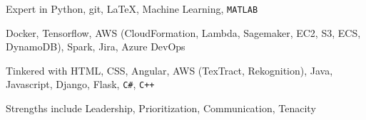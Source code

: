 

\begin{cvskills}

  \cvskill
    {Expert in} %
    {Python, git, \LaTeX, Machine Learning, {\texttt{MATLAB}}} %

    {Docker, Tensorflow, AWS (CloudFormation, Lambda, Sagemaker, EC2, S3, ECS, DynamoDB),
      Spark, Jira, Azure DevOps} %

  \cvskill
    {Tinkered with} %
    {HTML, CSS, Angular, AWS (TexTract, Rekognition), Java, Javascript, Django, Flask,
      {\texttt{C\#}}, {\texttt{C++}}} %

  \cvskill
    {Strengths include} %
    {Leadership, Prioritization, Communication, Tenacity} %

\end{cvskills}

